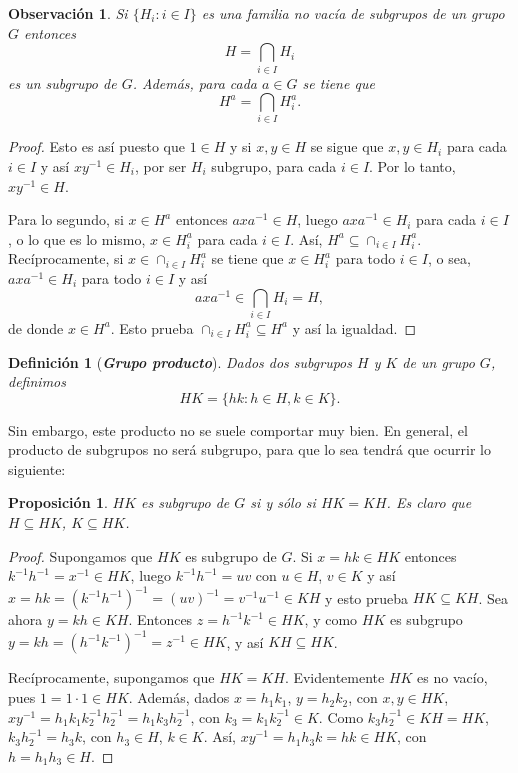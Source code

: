 \documentclass[12pt]{article}
\newtheorem{proposition}[theorem]{Proposición}
\newtheorem{definition}[theorem]{Definición}
\newtheorem{observation}{Observación}[theorem]
\begin{document}
\begin{observation}Si $\lbrace H_i : i \in I \rbrace$ es una familia no vacía de subgrupos de un grupo $G$ entonces $$H = \bigcap_{i \in I} H_i$$ es un subgrupo de $G$. Además, para cada $a \in G$ se tiene que $$H ^a = \bigcap_{i \in I} H_i^a.$$
\end{observation}
\begin{proof}
Esto es así puesto que $1 \in H$ y si $x,y \in H$ se sigue que $x,y \in H_i$ para cada $i \in I$ y así $xy^{-1} \in H_i$, por ser $H_i$ subgrupo, para cada $i \in I$. Por lo tanto, $xy^{-1} \in H$.

Para lo segundo, si $x \in H^a$ entonces $axa^{-1} \in H$, luego $axa^{-1} \in H_i$ para cada $i \in I$, o lo que es lo mismo, $x \in H_i^a$ para cada $i \in I$. Así, $ H^a \subseteq \cap_{i \in I}H_i^a.$ Recíprocamente, si $x \in \cap_{i \in I} H_i^a$ se tiene que $x \in H_i^a$ para todo $i \in I$, o sea, $axa^{-1} \in H_i$ para todo $i \in I$ y así $$axa^{-1} \in \bigcap_{i \in I} H_i = H,$$ de donde $x \in H^a$. Esto prueba $\cap_{i \in I} H_i^a \subseteq H^a$ y así la igualdad.

\end{proof}

\begin{definition}[\textbf{\textit{Grupo producto}}]Dados dos subgrupos $H$ y $K$ de un grupo $G$, definimos $$HK = \lbrace hk: h \in H, k \in K \rbrace.$$ 
\end{definition}

Sin embargo, este producto no se suele comportar muy bien. En general, el producto de subgrupos no será subgrupo, para que lo sea tendrá que ocurrir lo siguiente:

\begin{proposition}$HK$ es subgrupo de $G$ si y sólo si $HK = KH$. Es claro que $H \subseteq HK$, $K \subseteq HK$.
\end{proposition}
\begin{proof}
Supongamos que $HK$ es subgrupo de $G$. Si $x = hk \in HK$ entonces $k^{-1}h^{-1} = x^{-1} \in HK$, luego $k^{-1}h^{-1} = uv$ con $u \in H$, $v \in K$ y así $x = hk = (k^{-1}h^{-1})^{-1} = (uv)^{-1} = v^{-1}u^{-1} \in KH$ y esto prueba $HK \subseteq KH$. Sea ahora $y = kh \in KH$. Entonces $z = h^{-1}k^{-1} \in HK$, y como $HK$ es subgrupo $y = kh = (h^{-1}k^{-1})^{-1} = z^{-1} \in HK$, y así $KH \subseteq HK$.
 
Recíprocamente, supongamos que $HK = KH$. Evidentemente $HK$ es no vacío, pues $1 = 1 \cdot 1 \in HK$. Además, dados $x = h_{1}k_{1}$, $y = h_{2}k_{2}$, con $x,y \in HK$,$xy^{-1} = h_{1}k_{1}k_{2}^{-1}h_{2}^{-1} = h_{1}k_{3}h_{2}^{-1}$, con $k_{3} = k_{1}k_{2}^{-1} \in K$. Como $k_{3}h_{2}^{-1} \in KH = HK$, $k_{3}h_{2}^{-1} = h_{3}k$, con $h_{3} \in H$, $k \in K$. Así, $xy^{-1} = h_{1}h_{3}k = hk \in HK$, con $h = h_{1}h_{3} \in H$.

\end{proof}
\end{document}

